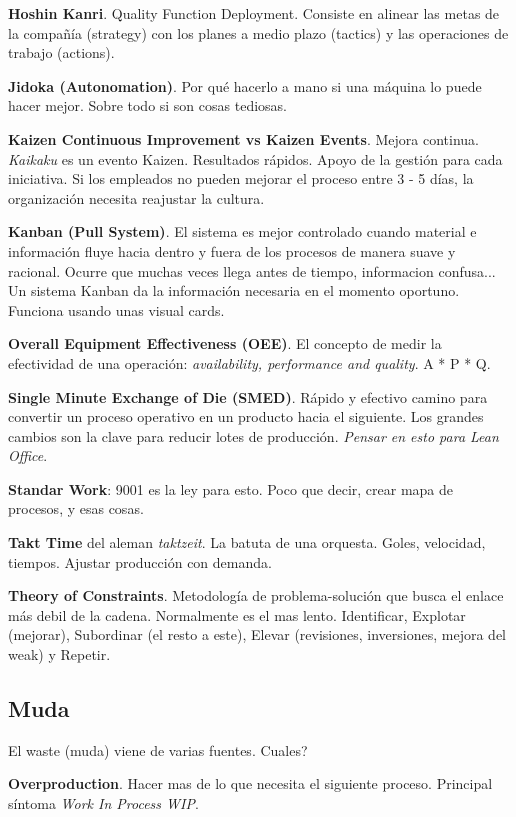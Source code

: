 \documentclass[]{article}
\begin{document}
\textbf{Hoshin Kanri}. Quality Function Deployment. Consiste en alinear las metas de la compañía (strategy) con los planes a medio plazo (tactics) y las operaciones de trabajo (actions). 

\textbf{Jidoka (Autonomation)}. Por qué hacerlo a mano si una máquina lo puede hacer mejor. Sobre todo si son cosas tediosas. 

\textbf{Kaizen Continuous Improvement vs Kaizen Events}. Mejora continua. \textit{Kaikaku} es un evento Kaizen. Resultados rápidos. Apoyo de la gestión para cada iniciativa. Si los empleados no pueden mejorar el proceso entre 3 - 5 días, la organización necesita reajustar la cultura.

\textbf{Kanban (Pull System)}. El sistema es mejor controlado cuando material e información fluye hacia dentro y fuera de los procesos de manera suave y racional. Ocurre que muchas veces llega antes de tiempo, informacion confusa... Un sistema Kanban da la información necesaria en el momento oportuno. Funciona usando unas visual cards.

\textbf{Overall Equipment Effectiveness (OEE)}. El concepto de medir la efectividad de una operación: \textit{availability, performance and quality}. A * P * Q. 

\textbf{Single Minute Exchange of Die (SMED)}. Rápido y efectivo camino para convertir un proceso operativo en un producto hacia el siguiente. Los grandes cambios son la clave para reducir lotes de producción. \textit{Pensar en esto para Lean Office}.

\textbf{Standar Work}: 9001 es la ley para esto. Poco que decir, crear mapa de procesos, y esas cosas.

\textbf{Takt Time} del aleman \textit{taktzeit}. La batuta de una orquesta. Goles, velocidad, tiempos. Ajustar producción con demanda.

\textbf{Theory of Constraints}. Metodología de problema-solución que busca el enlace más debil de la cadena. Normalmente es el mas lento. Identificar, Explotar (mejorar), Subordinar (el resto a este), Elevar (revisiones, inversiones, mejora del weak) y Repetir.

\subsection{Muda}

El waste (muda) viene de varias fuentes. Cuales?

\textbf{Overproduction}. Hacer mas de lo que necesita el siguiente proceso. Principal síntoma \textit{Work In Process WIP}.
\end{document}
